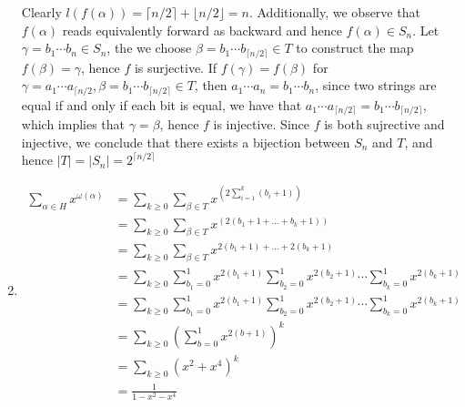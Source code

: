 \documentclass[11pt]{book}
\theoremstyle{definition}
\begin{document}
\begin{enumerate}
Clearly $l(f(\alpha)) = \lceil n / 2 \rceil + \lfloor n / 2 \rfloor = n$. Additionally, we observe that $f(\alpha)$ reads equivalently forward as backward and hence $f(\alpha) \in S_n$. Let $\gamma = b_1\cdots b_n \in S_n$, the we choose $\beta = b_1\cdots b_{\lceil n / 2 \rceil} \in T$ to construct the map $f(\beta) = \gamma$, hence $f$ is surjective. If $f(\gamma) = f(\beta)$ for $\gamma = a_1\cdots a_{\lceil n / 2}, \beta = b_1\cdots b_{\lceil n / 2 \rceil} \in T$, then $a_1\cdots a_n = b_1 \cdots b_n$, since two strings are equal if and only if each bit is equal, we have that $a_1\cdots a_{\lceil n / 2 \rceil} = b_1\cdots b_{\lceil n / 2 \rceil}$, which implies that $\gamma  = \beta$, hence $f$ is injective. Since $f$ is both sujrective and injective, we conclude that there exists a bijection between $S_n$ and $T$, and hence $|T| = |S_n| = 2^{\lceil n / 2 \rceil}$
\item \begin{align*}
\sum_{\alpha \in H}x^{\omega(\alpha)} &= \sum_{k \geq 0}\sum_{\beta\in T} x^{\left(2\sum_{i = 1}^k (b_i + 1)\right)}\\
&= \sum_{k \geq 0}\sum_{\beta \in T}x^{\left(2(b_1 + 1 + \dots + b_k + 1) \right)}\\
&= \sum_{k \geq 0}\sum_{\beta \in T}x^{2(b_1 + 1) + \dots + 2(b_k + 1)}\\
&= \sum_{k \geq 0}\sum_{b_1 = 0}^1x^{2(b_1 + 1)}\sum_{b_2 = 0}^1x^{2(b_2 + 1)} \cdots  \sum_{b_k = 0}^1x^{2(b_k + 1)}\\
&= \sum_{k \geq 0}\sum_{b_1 = 0}^1x^{2(b_1 + 1)}\sum_{b_2 = 0}^1x^{2(b_2 + 1)} \cdots  \sum_{b_k = 0}^1x^{2(b_k + 1)} \\
&= \sum_{k \geq 0}\left(\sum_{b = 0}^1x^{2(b + 1)} \right)^k\\
&= \sum_{k \geq 0}(x^2 + x^4)^k\\
&= \frac{1}{1 - x^2 - x^4}
\end{align*}

\end{enumerate}
\end{document}
